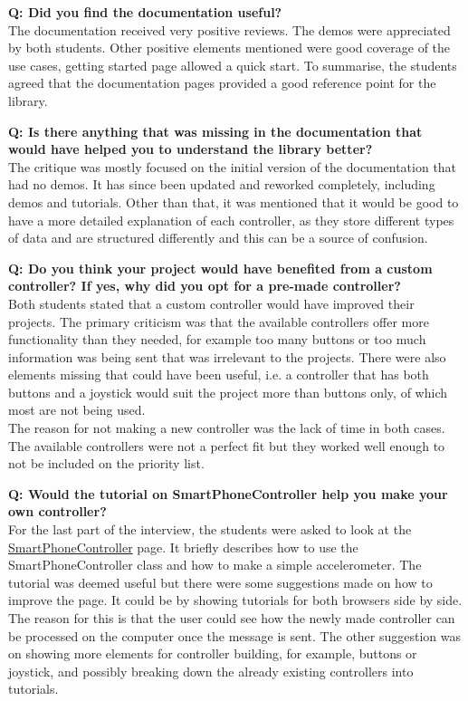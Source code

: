 \documentclass{l4proj}
\begin{document}
\textbf{Q: Did you find the documentation useful?} \\
The documentation received very positive reviews. The demos were appreciated by both students. Other positive elements mentioned were good coverage of the use cases, getting started page allowed a quick start. To summarise, the students agreed that the documentation pages provided a good reference point for the library. \par 

\textbf{Q: Is there anything that was missing in the documentation that would have helped you to understand the library better?} \\
The critique was mostly focused on the initial version of the documentation that had no demos. It has since been updated and reworked completely, including demos and tutorials. Other than that, it was mentioned that it would be good to have a more detailed explanation of each controller, as they store different types of data and are structured differently and this can be a source of confusion. \par 

\textbf{Q: Do you think your project would have benefited from a custom controller? If yes, why did you opt for a pre-made controller?} \\
Both students stated that a custom controller would have improved their projects. The primary criticism was that the available controllers offer more functionality than they needed, for example too many buttons or too much information was being sent that was irrelevant to the projects. There were also elements missing that could have been useful, i.e. a controller that has both buttons and a joystick would suit the project more than buttons only, of which most are not being used. \\
The reason for not making a new controller was the lack of time in both cases. The available controllers were not a perfect fit but they worked well enough to not be included on the priority list.  \par

\textbf{Q: Would the tutorial on SmartPhoneController help you make your own controller?} \\
For the last part of the interview, the students were asked to look at the \href{https://smartcontrollerjs.github.io/SmartController/smartphonecontroller.html}{SmartPhoneController} page. It briefly describes how to use the SmartPhoneController class and how to make a simple accelerometer. The tutorial was deemed useful but there were some suggestions made on how to improve the page. It could be by showing tutorials for both browsers side by side. The reason for this is that the user could see how the newly made controller can be processed on the computer once the message is sent. The other suggestion was on showing more elements for controller building, for example, buttons or joystick, and possibly breaking down the already existing controllers into tutorials. \par
\end{document}
